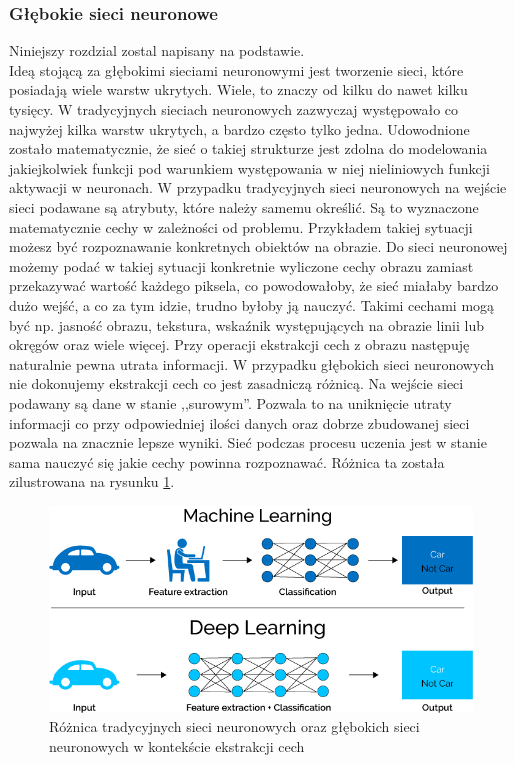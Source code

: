 \subsubsection{Głębokie sieci neuronowe}
Niniejszy rozdzial zostal napisany na podstawie\cite{dnn1}.\\
Ideą stojącą za głębokimi sieciami neuronowymi jest tworzenie sieci, które posiadają wiele warstw ukrytych. Wiele, to znaczy od kilku do nawet kilku tysięcy. W tradycyjnych sieciach neuronowych zazwyczaj występowało co najwyżej kilka warstw ukrytych, a bardzo często tylko jedna. Udowodnione zostało matematycznie, że sieć o takiej strukturze jest zdolna do modelowania jakiejkolwiek funkcji pod warunkiem występowania w niej nieliniowych funkcji aktywacji w neuronach. W przypadku tradycyjnych sieci neuronowych na wejście sieci podawane są atrybuty, które należy samemu określić. Są to wyznaczone matematycznie cechy w zależności od problemu. Przykładem takiej sytuacji możesz być rozpoznawanie konkretnych obiektów na obrazie. Do sieci neuronowej możemy podać w takiej sytuacji konkretnie wyliczone cechy obrazu zamiast przekazywać wartość każdego piksela, co powodowałoby, że sieć miałaby bardzo dużo wejść, a co za tym idzie, trudno byłoby ją nauczyć. Takimi cechami mogą być np. jasność obrazu, tekstura, wskaźnik występujących na obrazie linii lub okręgów oraz wiele więcej. Przy operacji ekstrakcji cech z obrazu następuję naturalnie pewna utrata informacji. W przypadku głębokich sieci neuronowych nie dokonujemy ekstrakcji cech co jest zasadniczą różnicą. Na wejście sieci podawany są dane w stanie ,,surowym''. Pozwala to na uniknięcie utraty informacji co przy odpowiedniej ilości danych oraz dobrze zbudowanej sieci pozwala na znacznie lepsze wyniki. Sieć podczas procesu uczenia jest w stanie sama nauczyć się jakie cechy powinna rozpoznawać. Różnica ta została zilustrowana na rysunku \ref{dnnDiff}.

\begin{figure}[ht!]
\centering
\includegraphics[scale=0.5]{res/dnn1.png}
\caption[Caption for LOF]{Różnica tradycyjnych sieci neuronowych oraz głębokich sieci neuronowych w kontekście ekstrakcji cech\label{dnnDiff}\footnotemark} 
\end{figure}

